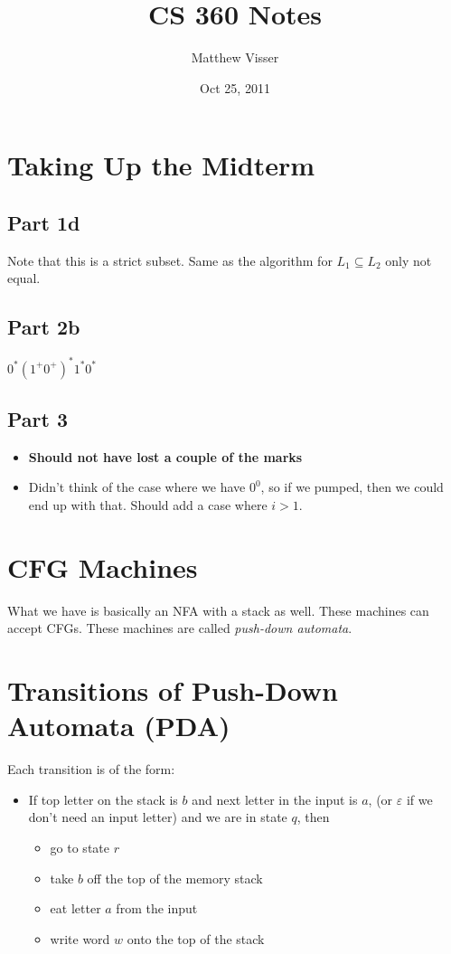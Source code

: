 \documentclass[12pt]{article}
\begin{document}
\title{CS 360 Notes}
\author{Matthew Visser}
\date{Oct 25, 2011}
\maketitle

\section{Taking Up the Midterm}

\subsection{Part 1d}

Note that this is a strict subset. Same as the algorithm for $L_1 \subseteq L_2$
only not equal.

\subsection{Part 2b}

$0^*(1^+0^+)^*1^*0^*$

\subsection{Part 3}

\begin{itemize}
	\item \textbf{Should not have lost a couple of the marks}
	\item Didn't think of the case where we have $0^0$, so if we pumped, then we
		could end up with that. Should add a case where $i>1$.
\end{itemize}

\section{CFG Machines}

What we have is basically an NFA with a stack as well. These machines can
accept CFGs. These machines are called \emph{push-down automata}.

\section{Transitions of Push-Down Automata (PDA)}

Each transition is of the form:
\begin{itemize}
	\item If top letter on the stack is $b$ and next letter in the input is $a$,
		(or $\varepsilon$ if we don't need an input letter) and we are in state
		$q$, then  
		\begin{itemize}
			\item go to state $r$
			\item take $b$ off the top of the memory stack
			\item eat letter $a$ from the input
			\item write word $w$ onto the top of the stack
		\end{itemize}
\end{itemize}
\end{document}
